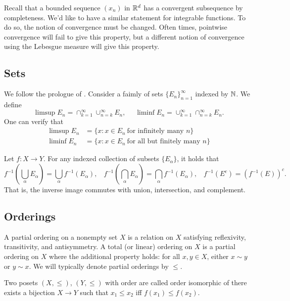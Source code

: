 \documentclass[12pt]{article} %
\begin{document}
\begin{example}
    Recall that a bounded sequence $(x_n)$ in $\mathbb{R}^d$ has a convergent subsequence by completeness. We'd like to have a similar statement for integrable functions. To do so, the notion of convergence must be changed. Often times, pointwise convergence will fail to give this property, but a different notion of convergence using the Lebesgue measure will give this property.
\end{example}

\subsection{Sets}

We follow the prologue of \cite{folland1999real}. Consider a faimly of sets $\{E_n\}_{n=1}^{\infty}$ indexed by $\mathbb{N}$. We define \[\limsup E_n = \cap_{k=1}^{\infty} \cup_{n=k}^{\infty} E_n, \ \ \ \ \ \ \liminf E_n = \cup_{k=1}^{\infty} \cap_{n=k}^{\infty} E_n.\] One can verify that \begin{align*}
    \limsup E_n &= \{x : x \in E_n \ \text{for infinitely many $n$} \}\\
    \liminf E_n &= \{x : x \in E_n \ \text{for all but finitely many $n$} \}
\end{align*}

Let $f : X \to Y$. For any indexed collection of subsets $\{E_\alpha\}$, it holds that \[f^{-1}\left(\bigcup_{\alpha} E_\alpha \right) = \bigcup_{\alpha} f^{-1} (E_\alpha), \ \ \ \ f^{-1}\left(\bigcap_{\alpha} E_\alpha \right) = \bigcap_{\alpha} f^{-1} (E_\alpha), \ \ \ \ f^{-1}(E^c) = \left(f^{-1}(E)\right)^c.\] That is, the inverse image commutes with union, intersection, and complement.

\subsection{Orderings}

\begin{definition}
    A partial ordering on a nonempty set $X$ is a relation on $X$ satisfying reflexivity, transitivity, and antisymmetry. A total (or linear) ordering on $X$ is a partial ordering on $X$ where the additional property holds: for all $x, y \in X$, either $x \sim y$ or $y \sim x$. We will typically denote partial orderings by $\leq$.
\end{definition}

\begin{definition}
    Two posets $(X, \leq)$, $(Y, \leq)$ with order are called order isomorphic of there exists a bijection $X \to Y$ such that $x_1 \leq x_2$ iff $f(x_1) \leq f(x_2)$.
\end{definition}
\end{document}
